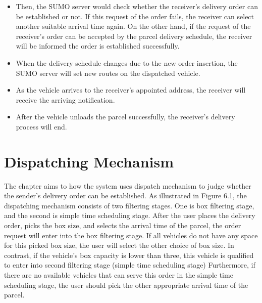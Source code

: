\documentclass[12pt]{ksthesis}
\begin{document}
\begin{thesis}
{\begin{itemize}
\item
Then, the SUMO server would check whether the receiver’s delivery order can be established or not. If this request of the order fails, the receiver can select another suitable arrival time again. On the other hand, if the request of the receiver’s order can be accepted by the parcel delivery schedule, the receiver will be informed the order is established successfully.


\item
When the delivery schedule changes due to the new order insertion, the SUMO server will set new routes on the dispatched vehicle.

\item
As the vehicle arrives to the receiver’s appointed address, the receiver will receive the arriving notification.

\item
After the vehicle unloads the parcel successfully, the receiver’s delivery process will end.

\end{itemize}


\chapter{Dispatching Mechanism}\label{Chap:Dispatching Mechanism}
The chapter aims to how the system uses dispatch mechanism to judge whether the sender’s delivery order can be established.
As illustrated in Figure 6.1, the dispatching mechanism consists of two filtering stages. One is box filtering stage, and the second is simple time scheduling stage. After the user places the delivery order, picks the box size, and selects the arrival time of the parcel, the order request will enter into the box filtering stage.
If all vehicles do not have any space for this picked box size, the user will select the other choice of box size. In contrast, if the vehicle’s box capacity is lower than three, this vehicle is qualified to enter into second filtering stage (simple time scheduling stage) 
Furthermore, if there are no available vehicles that can serve this order in the simple time scheduling stage, the user should pick the other appropriate arrival time of the parcel.

}
\end{thesis}
\end{document}
